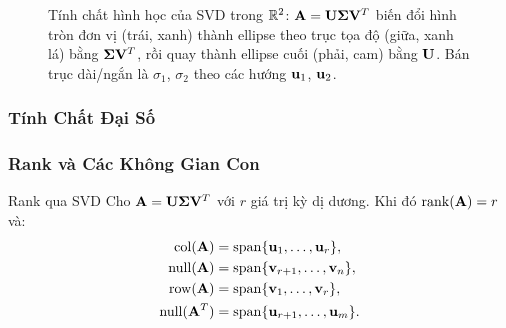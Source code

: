 \begin{figure}[H]
\caption{Tính chất hình học của SVD trong $\mathbb{R}^2$: $\mathbf{A} = \mathbf{U}\boldsymbol{\Sigma}\mathbf{V}^T$
biến đổi hình tròn đơn vị (trái, \textcolor{primaryblue}{xanh}) thành ellipse
theo trục tọa độ (giữa, \textcolor{successgreen!70!black}{xanh lá}) bằng
$\boldsymbol{\Sigma}\mathbf{V}^T$, rồi quay thành ellipse cuối (phải,
\textcolor{warnorange}{cam}) bằng $\mathbf{U}$. Bán trục dài/ngắn là $\sigma_1$,
$\sigma_2$ theo các hướng $\mathbf{u}_1$, $\mathbf{u}_2$.}
\label{fig:svd_geometry}
\end{figure}

\subsubsection{Tính Chất Đại Số}

\subsubsection{Rank và Các Không Gian Con}

\begin{mythm}{Rank qua SVD}{}
Cho $\mathbf{A} = \mathbf{U}\boldsymbol{\Sigma}\mathbf{V}^T$ với $r$ giá trị kỳ dị dương.
Khi đó $\operatorname{rank}(\mathbf{A}) = r$ và:
\begin{align*}
    \operatorname{col}(\mathbf{A}) &= \operatorname{span}\{\mathbf{u}_1, \ldots, \mathbf{u}_r\}, \\
    \operatorname{null}(\mathbf{A}) &= \operatorname{span}\{\mathbf{v}_{r+1}, \ldots, \mathbf{v}_n\}, \\
    \operatorname{row}(\mathbf{A}) &= \operatorname{span}\{\mathbf{v}_1, \ldots, \mathbf{v}_r\}, \\
    \operatorname{null}(\mathbf{A}^T) &= \operatorname{span}\{\mathbf{u}_{r+1}, \ldots, \mathbf{u}_m\}.
\end{align*}
\end{mythm}

